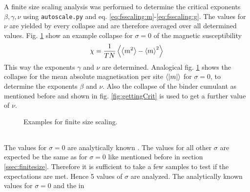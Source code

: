     A finite size scaling analysis was
    performed to determine the critical exponents \(\beta, \gamma, \nu\)
    using \texttt{autoscale.py} \cite{autoscale2009} and eq. \eqref{eq:fsscaling:m}-\eqref{eq:fsscaling:g}.
    The values for \(\nu\) are yielded by every collapse and are therefore
    averaged over all determined values. Fig. \ref{fig:gettingCrit2}
    show an example collapse for \(\sigma=0\) of the magnetic susceptibility
    \[\chi = \frac{1}{TN}\left< \left< m^2 \right> - \left< m \right>^2 \right>\]
    This way the exponents \(\gamma\) and \(\nu\) are determined.
    Analogical fig. \ref{fig:gettingCrit2}
    shows the collapse for the mean absolute magnetisation per site \(\left< \left\vert m\right\vert \right>\) for \(\sigma=0\),
    to determine the exponents \(\beta\) and \(\nu\).
    Also the collapse of the binder cumulant as mentioned before and shown
    in fig. \ref{fig:gettingCrit}
    is used to get a further value of \(\nu\).
    \begin{figure}[htbp]
        \centering
        \caption[Examples of determining critical temperature and exponents]
        {
            Examples for finite size scaling.
        }
        \label{fig:gettingCrit2}
    \end{figure}\\
    The values for
    \(\sigma = 0\) are analytically known \cite{Pelissetto2002}. The
    values for all other \(\sigma\) are expected be the same as for
    \(\sigma = 0\) like mentioned before in section \ref{ssec:finitesize}.
    Therefore it is sufficient to take a few samples to test if the
    expectations are met. Hence 5 values of \(\sigma\) are analyzed.
    The analytically known values for \(\sigma = 0\) and the in \cite{Janke1994}
